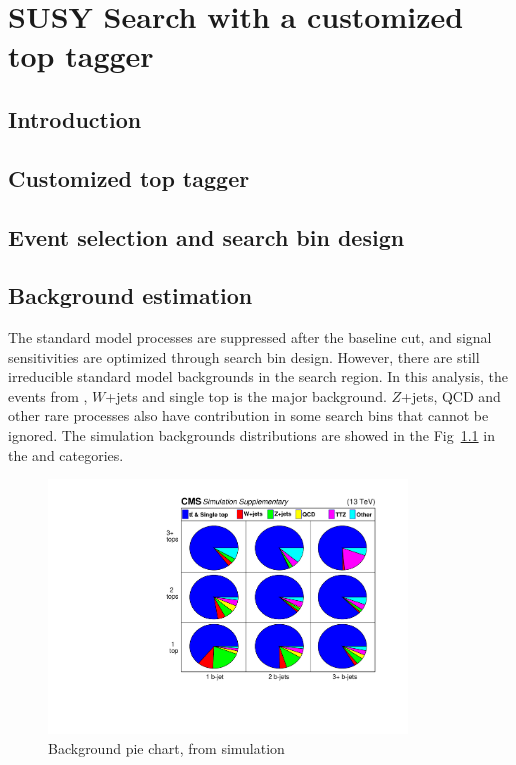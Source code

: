 \chapter{SUSY Search with a customized top tagger}

\clearpage
\section{Introduction}
\label{sec:c4intro}


\clearpage
\section{Customized top tagger}
\label{sec:c4tt}


\clearpage
\section{Event selection and search bin design}
\label{sec:c4evssbd}


\clearpage
\section{Background estimation}

The standard model processes are suppressed after the baseline cut, and signal sensitivities are optimized through search bin design. However, there are still irreducible standard model backgrounds in the search region. In this analysis, the events from \ttbar, $W$+jets and single top is the major background. $Z$+jets, QCD and other rare processes also have contribution in some search bins that cannot be ignored. The simulation backgrounds distributions are showed in the Fig~\ref{fig:c4bgmcpie} in the \ntops and \nbjets categories.

\begin{figure}[htbp]
 \begin{center}
  \includegraphics[width=0.85\textwidth]{figures/c4/c4_bg_mcpie.pdf}
 \end{center}
 \caption{Background pie chart, from simulation}
 \label{fig:c4bgmcpie}
\end{figure}


